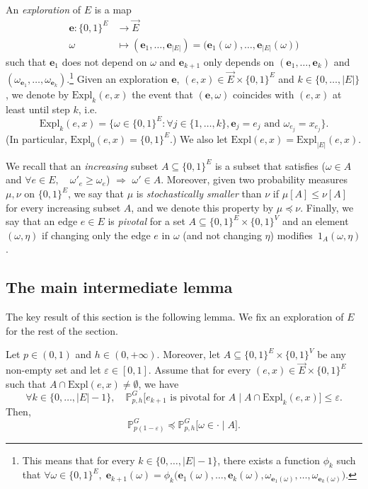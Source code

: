 \documentclass[AHL,Unicode,longabstracts,published]{cedram}
\newcommand{\Pro}{\mathbb{P}}
\newcommand{\ee}{\mathbf{e}}
\newcommand{\Expl}{\mathrm{Expl}}
\let\oldforall\forall
\renewcommand*{\forall}{\mathrel{\oldforall}}
\begin{document}
\begin{defi}\label{defi:expl}
An \emph{exploration} of $E$ is a map
\begin{align*}
\ee : \{0,1\}^E & \longrightarrow \vec{E}\\
\omega & \longmapsto (\ee_1,\dots,\ee_{|E|})=\big(\ee_1(\omega),\dots,\ee_{|E|}(\omega)\big)
\end{align*}
such that $\ee_1$ does not depend on $\omega$ and $\ee_{k+1}$ only depends on $(\ee_1,\dots,\ee_k)$ and $(\omega_{\ee_1},\dots,\omega_{\ee_k})$.\footnote{This means that for every $k \in \{0,\dots,|E|-1\}$, there exists a function $\phi_k$ such that $\forall \omega \in \{0,1\}^E, \; \ee_{k+1}(\omega)=\phi_k\big(\ee_1(\omega),\dots,\ee_k(\omega),\omega_{\ee_1(\omega)},\dots,\omega_{\ee_k(\omega)})$.}
Given an exploration $\ee$, $(e,x) \in \vec{E}\times\{0,1\}^E$ and $k \in \{0,\dots,|E|\}$, we denote by $\Expl_k(e,x)$ the event that $(\ee,\omega)$ coincides with $(e,x)$ at least until step $k$, i.e.
\[
\Expl_k(e,x)=\big\{\omega \in \{0,1\}^E : \forall j \in \{1,\dots,k\}, \ee_j=e_j\text{ and }\omega_{e_j}=x_{e_j}\big\}.
\]
(In particular, $\Expl_0(e,x)=\{0,1\}^E$.) We also let $\Expl(e,x)=\Expl_{|E|}(e,x)$.
\end{defi}

We recall that an \emph{increasing} subset $A\subseteq\{0,1\}^E$ is a subset that satisfies ($\omega \in A$ and $\forall e \in E, \quad \omega'_e \ge \omega_e$) $\Rightarrow$ $\omega'\in A$. Moreover, given two probability measures $\mu,\nu$ on $\{0,1\}^E$, we say that $\mu$ is \emph{stochastically smaller} than $\nu$ if $\mu[A]\le \nu[A]$ for every increasing subset $A$, and we denote this property by $\mu \preceq \nu$. Finally, we say that an edge $e \in E$ is \emph{pivotal} for a set $A \subseteq \{0,1\}^E \times \{0,1\}^V$ and an element~$(\omega,\eta)$ if changing only the edge $e$ in $\omega$ (and not changing $\eta$) modifies~$1_A(\omega,\eta)$.

\subsection{The main intermediate lemma}

The key result of this section is the following lemma. We fix an exploration of $E$ for the rest of the section.

\begin{lemm}\label{lem:coupl}
Let $p \in (0,1)$ and $h \in (0,+\infty)$. Moreover, let $A \subseteq \{0,1\}^E \times \{0,1\}^V$ be any non-empty set and let $\varepsilon \in [0,1]$. Assume that for every $(e,x) \in \vec{E}\times\{0,1\}^E$ such that $A \cap \Expl(e,x)\neq \emptyset$, we have
\[
\forall k \in \{0,\dots,|E|-1\}, \quad \Pro_{p,h}^G \big[\text{$e_{k+1}$ is pivotal for $A$} \; \big| \; A \cap \Expl_k(e,x) \big] \le \varepsilon.
\]
Then,
\[
\Pro_{p(1-\varepsilon)}^G \preceq \Pro_{p,h}^G \big[\omega \in \cdot \; \big| \; A \big].
\]
\end{lemm}
\end{document}
